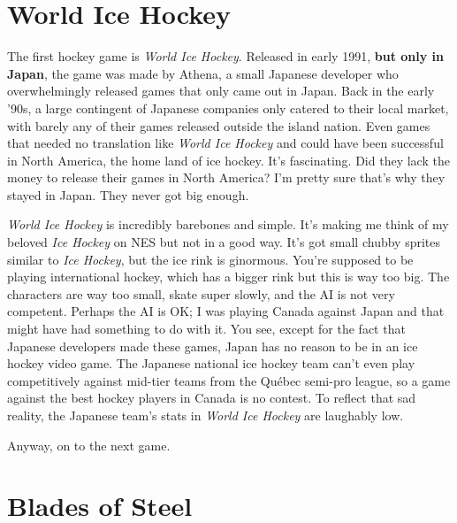 \documentclass{book}
\let\oldcenter\center
\let\oldendcenter\endcenter
\renewenvironment{center}{\setlength\topsep{0pt}\oldcenter}{\oldendcenter}
\begin{document}
\FloatBarrier\needspace{10mm}\section*{World Ice Hockey}\nopagebreak[4]

\begin{center}
\vspace{8pt}
\quad\vspace{4pt}
\end{center}

The first hockey game is \emph{World Ice Hockey}. Released in early 1991, \textbf{but only in Japan}, the game was made by Athena, a small Japanese developer who overwhelmingly released games that only came out in Japan. Back in the early ’90s, a large contingent of Japanese companies only catered to their local market, with barely any of their games released outside the island nation. Even games that needed no translation like \emph{World Ice Hockey} and could have been successful in North America, the home land of ice hockey. It’s fascinating. Did they lack the money to release their games in North America? I’m pretty sure that’s why they stayed in Japan. They never got big enough.

\emph{World Ice Hockey} is incredibly barebones and simple. It’s making me think of my beloved \emph{Ice Hockey} on NES but not in a good way. It’s got small chubby sprites similar to \emph{Ice Hockey}, but the ice rink is ginormous. You’re supposed to be playing international hockey, which has a bigger rink but this is way too big. The characters are way too small, skate super slowly, and the AI is not very competent. Perhaps the AI is OK; I was playing Canada against Japan and that might have had something to do with it. You see, except for the fact that Japanese developers made these games, Japan has no reason to be in an ice hockey video game. The Japanese national ice hockey team can’t even play competitively against mid-tier teams from the Québec semi-pro league, so a game against the best hockey players in Canada is no contest. To reflect that sad reality, the Japanese team’s stats in \emph{World Ice Hockey} are laughably low.

Anyway, on to the next game.

\FloatBarrier\needspace{10mm}\section*{Blades of Steel}\nopagebreak[4]
\end{document}
